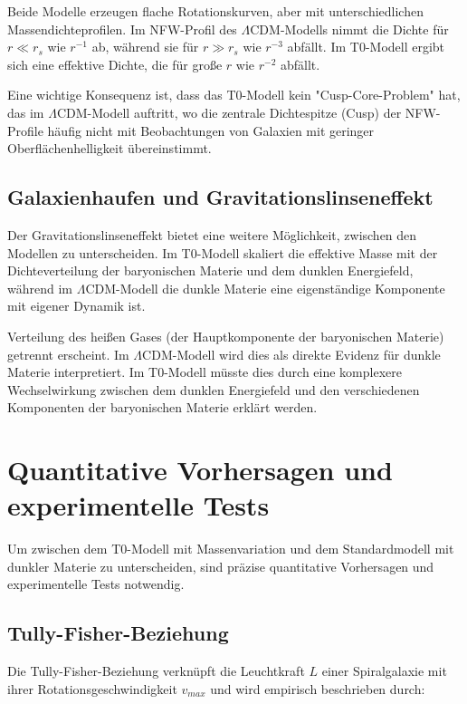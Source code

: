 \documentclass[a4paper,12pt]{article}
\begin{document}
Beide Modelle erzeugen flache Rotationskurven, aber mit unterschiedlichen Massendichteprofilen. Im NFW-Profil des $\Lambda$CDM-Modells nimmt die Dichte für $r \ll r_s$ wie $r^{-1}$ ab, während sie für $r \gg r_s$ wie $r^{-3}$ abfällt. Im T0-Modell ergibt sich eine effektive Dichte, die für große $r$ wie $r^{-2}$ abfällt.

Eine wichtige Konsequenz ist, dass das T0-Modell kein "Cusp-Core-Problem" hat, das im $\Lambda$CDM-Modell auftritt, wo die zentrale Dichtespitze (Cusp) der NFW-Profile häufig nicht mit Beobachtungen von Galaxien mit geringer Oberflächenhelligkeit übereinstimmt.

\subsection{Galaxienhaufen und Gravitationslinseneffekt}

Der Gravitationslinseneffekt bietet eine weitere Möglichkeit, zwischen den Modellen zu unterscheiden. Im T0-Modell skaliert die effektive Masse mit der Dichteverteilung der baryonischen Materie und dem dunklen Energiefeld, während im $\Lambda$CDM-Modell die dunkle Materie eine eigenständige Komponente mit eigener Dynamik ist.

Verteilung des heißen Gases (der Hauptkomponente der baryonischen Materie) getrennt erscheint. Im $\Lambda$CDM-Modell wird dies als direkte Evidenz für dunkle Materie interpretiert. Im T0-Modell müsste dies durch eine komplexere Wechselwirkung zwischen dem dunklen Energiefeld und den verschiedenen Komponenten der baryonischen Materie erklärt werden.

\section{Quantitative Vorhersagen und experimentelle Tests}

Um zwischen dem T0-Modell mit Massenvariation und dem Standardmodell mit dunkler Materie zu unterscheiden, sind präzise quantitative Vorhersagen und experimentelle Tests notwendig.

\subsection{Tully-Fisher-Beziehung}

Die Tully-Fisher-Beziehung verknüpft die Leuchtkraft $L$ einer Spiralgalaxie mit ihrer Rotationsgeschwindigkeit $v_{max}$ und wird empirisch beschrieben durch:
\end{document}

